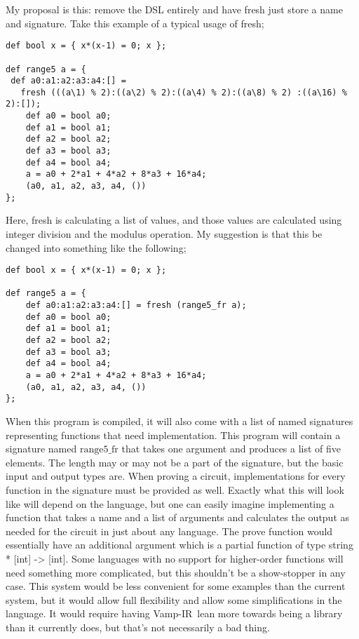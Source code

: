 \documentclass{msc}
\newcommand{\vampir}{Vamp-IR}
\begin{document}
My proposal is this: remove the DSL entirely and have fresh just store a name and signature. Take this example of a typical usage of fresh;


\begin{verbatim}
def bool x = { x*(x-1) = 0; x };

def range5 a = {
 def a0:a1:a2:a3:a4:[] =
   fresh (((a\1) % 2):((a\2) % 2):((a\4) % 2):((a\8) % 2) :((a\16) % 2):[]);
    def a0 = bool a0;
    def a1 = bool a1;
    def a2 = bool a2;
    def a3 = bool a3;
    def a4 = bool a4;
    a = a0 + 2*a1 + 4*a2 + 8*a3 + 16*a4;
    (a0, a1, a2, a3, a4, ())
};
\end{verbatim}

Here, fresh is calculating a list of values, and those values are calculated using integer division and the modulus operation. My suggestion is that this be changed into something like the following;

\begin{verbatim}
def bool x = { x*(x-1) = 0; x };

def range5 a = {
    def a0:a1:a2:a3:a4:[] = fresh (range5_fr a);
    def a0 = bool a0;
    def a1 = bool a1;
    def a2 = bool a2;
    def a3 = bool a3;
    def a4 = bool a4;
    a = a0 + 2*a1 + 4*a2 + 8*a3 + 16*a4;
    (a0, a1, a2, a3, a4, ())
};
\end{verbatim}

When this program is compiled, it will also come with a list of named signatures representing functions that need implementation. This program will contain a signature named $\text{range5\_fr}$ that takes one argument and produces a list of five elements. The length may or may not be a part of the signature, but the basic input and output types are. When proving a circuit, implementations for every function in the signature must be provided as well. Exactly what this will look like will depend on the language, but one can easily imagine implementing a function that takes a name and a list of arguments and calculates the output as needed for the circuit in just about any language. The prove function would essentially have an additional argument which is a partial function of type string * [int] -> [int]. Some languages with no support for higher-order functions will need something more complicated, but this shouldn't be a show-stopper in any case. This system would be less convenient for some examples than the current system, but it would allow full flexibility and allow some simplifications in the language. It would require having \vampir\ lean more towards being a library than it currently does, but that's not necessarily a bad thing.
\end{document}
